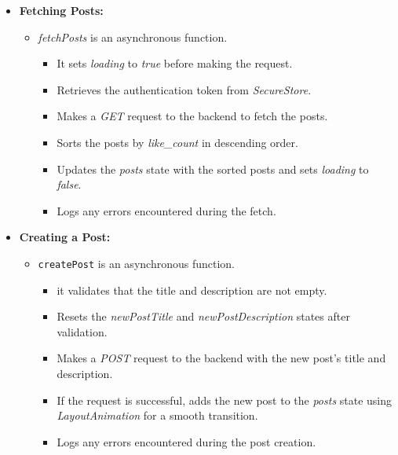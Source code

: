 \begin{itemize}
    \item \textbf{Fetching Posts:}
    \begin{itemize}
        \item \textit{fetchPosts} is an asynchronous function.
        \begin{itemize}
            \item It sets \textit{loading} to \textit{true} before making the request.
            \item Retrieves the authentication token from \textit{SecureStore}.
            \item Makes a \textit{GET} request to the backend to fetch the posts.
            \item Sorts the posts by \textit{like\_count} in descending order.
            \item Updates the \textit{posts} state with the sorted posts and sets \textit{loading} to \textit{false}.
            \item Logs any errors encountered during the fetch.
        \end{itemize}
    \end{itemize}

    \item \textbf{Creating a Post:}
    \begin{itemize}
        \item \texttt{createPost} is an asynchronous function.
        \begin{itemize}
            \item it validates that the title and description are not empty.
            \item Resets the \textit{newPostTitle} and \textit{newPostDescription} states after validation.
            \item Makes a \textit{POST} request to the backend with the new post's title and description.
            \item If the request is successful, adds the new post to the \textit{posts} state using \textit{LayoutAnimation} for a smooth transition.
            \item Logs any errors encountered during the post creation.
        \end{itemize}
    \end{itemize}


\end{itemize}
